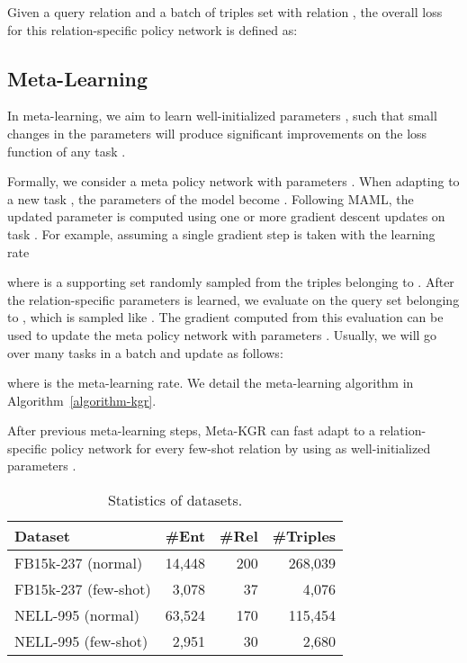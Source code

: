 \documentclass[11pt,a4paper]{article}
\begin{document}
Given a query relation  and a batch of triples set  with relation , the overall loss for this relation-specific policy network is defined as:







\subsection{Meta-Learning}





In meta-learning, we aim to learn well-initialized parameters , such that small changes in the parameters will produce significant improvements on the loss function of any task \cite{MAML}.

Formally, we consider a meta policy network with parameters . When adapting to a new task , the parameters of the model become . Following MAML, the updated parameter  is computed using one or more gradient descent updates on task . For example, assuming a single gradient step is taken with the learning rate 

where  is a supporting set randomly sampled from the triples belonging to . After the relation-specific parameters  is learned, we evaluate  on the query set  belonging to , which is sampled like . The gradient computed from this evaluation can be used to update the meta policy network with parameters . Usually, we will go over many tasks in a batch and update  as follows:

where  is the meta-learning rate. We detail the meta-learning algorithm in Algorithm~\ref{algorithm-kgr}.

After previous meta-learning steps, Meta-KGR can fast adapt to a relation-specific policy network for every few-shot relation by using  as well-initialized parameters .

\begin{table}[t]
\small
\centering
\setlength{\belowcaptionskip}{-1pt}
    \begin{tabular}{lrrr}
    \toprule
    \textbf{Dataset} & \textbf{\#Ent} & \textbf{\#Rel} & \textbf{\#Triples} \\
    \midrule
    FB15k-237 (normal) & 14,448 & 200 & 268,039 \\
    FB15k-237 (few-shot) & 3,078 & 37 & 4,076 \\
    NELL-995 (normal) & 63,524 & 170 & 115,454 \\
    NELL-995 (few-shot) & 2,951 & 30 & 2,680 \\
    \bottomrule
    \end{tabular} 
    \caption{\label{table2} Statistics of datasets.}
    \vspace{-0.8em}
\end{table}
\end{document}
